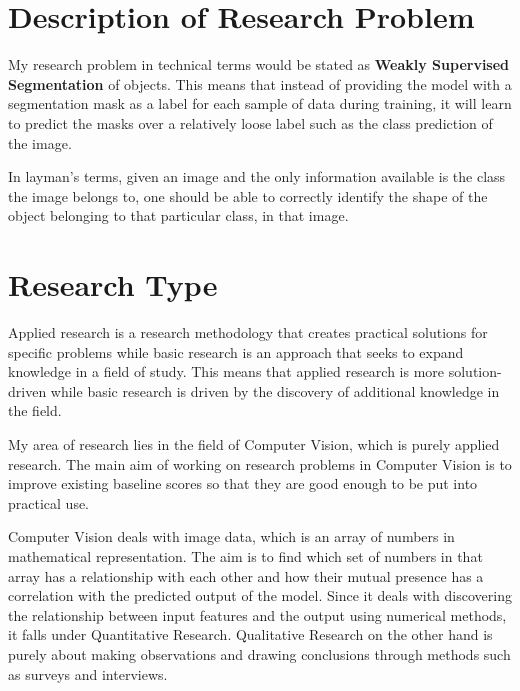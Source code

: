 \documentclass[11pt]{article}
\begin{document}
\section{Description of Research Problem}
My research problem in technical terms would be stated as \textbf{Weakly Supervised Segmentation} of objects. This means that instead of providing the model with a segmentation mask as a label for each sample of data during training, it will learn to predict the masks over a relatively loose label such as the class prediction of the image. \par
In layman's terms, given an image and the only information available is the class the image belongs to, one should be able to correctly identify the shape of the object belonging to that particular class, in that image. 
\section{Research Type}
Applied research is a research methodology that creates practical solutions for specific problems while basic research is an approach that seeks to expand knowledge in a field of study. This means that applied research is more solution-driven while basic research is driven by the discovery of additional knowledge in the field. \par
My area of research lies in the field of Computer Vision, which is purely applied research. The main aim of working on research problems in Computer Vision is to improve existing baseline scores so that they are good enough to be put into practical use. \par
Computer Vision deals with image data, which is an array of numbers in mathematical representation. The aim is to find which set of numbers in that array has a relationship with each other and how their mutual presence has a correlation with the predicted output of the model. Since it deals with discovering the relationship between input features and the output using numerical methods, it falls under Quantitative Research. Qualitative Research on the other hand is purely about making observations and drawing conclusions through methods such as surveys and interviews. 
\end{document}
